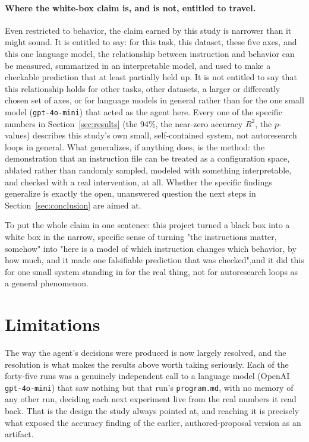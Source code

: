 \documentclass[11pt]{article}
\begin{document}
\paragraph{Where the white-box claim is, and is not, entitled to travel.} Even restricted to behavior, the claim earned by this study is narrower than it might sound. It is entitled to say: for this task, this dataset, these five axes, and this one language model, the relationship between instruction and behavior can be measured, summarized in an interpretable model, and used to make a checkable prediction that at least partially held up. It is not entitled to say that this relationship holds for other tasks, other datasets, a larger or differently chosen set of axes, or for language models in general rather than for the one small model (\texttt{gpt-4o-mini}) that acted as the agent here. Every one of the specific numbers in Section~\ref{sec:results} (the 94\%, the near-zero accuracy $R^2$, the $p$-values) describes this study's own small, self-contained system, not autoresearch loops in general. What generalizes, if anything does, is the method: the demonstration that an instruction file can be treated as a configuration space, ablated rather than randomly sampled, modeled with something interpretable, and checked with a real intervention, at all. Whether the specific findings generalize is exactly the open, unanswered question the next steps in Section~\ref{sec:conclusion} are aimed at.

To put the whole claim in one sentence: this project turned a black box into a white box in the narrow, specific sense of turning "the instructions matter, somehow" into "here is a model of which instruction changes which behavior, by how much, and it made one falsifiable prediction that was checked",and it did this for one small system standing in for the real thing, not for autoresearch loops as a general phenomenon.

\section{Limitations}
\label{sec:limitations}

The way the agent's decisions were produced is now largely resolved, and the resolution is what makes the results above worth taking seriously. Each of the forty-five runs was a genuinely independent call to a language model (OpenAI \texttt{gpt-4o-mini}) that saw nothing but that run's \texttt{program.md}, with no memory of any other run, deciding each next experiment live from the real numbers it read back. That is the design the study always pointed at, and reaching it is precisely what exposed the accuracy finding of the earlier, authored-proposal version as an artifact.
\end{document}
